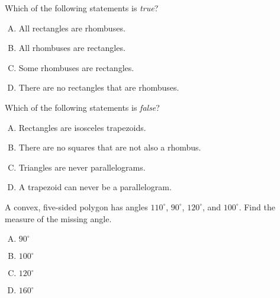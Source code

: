 \documentclass[12pt,letterpaper]{exam}
\begin{document}
\begin{questions}
\vfill



\question Which of the following statements is \textit{true}?
        \begin{enumerate}[A.]
        \item All rectangles are rhombuses.
        \item All rhombuses are rectangles.
        \item Some rhombuses are rectangles.
        \item There are no rectangles that are rhombuses. 
        \end{enumerate}



\vfill



\question Which of the following statements is \textit{false}?
        \begin{enumerate}[A.]
        \item Rectangles are isosceles trapezoids. 
        \item There are no squares that are not also a rhombus. 
        \item Triangles are never parallelograms. 
        \item A trapezoid can never be a parallelogram. 
        \end{enumerate}



\newpage



\question A convex, five-sided polygon has angles $110^\circ$, $90^\circ$, $120^\circ$, and $100^\circ$. Find the measure of the missing angle. 

        \begin{enumerate}[A.]
        \item $90^\circ$
        \item $100^\circ$
        \item $120^\circ$
        \item $160^\circ$
        \end{enumerate}




\end{questions}
\end{document}
